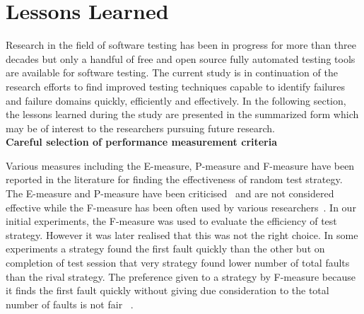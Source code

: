 \section{Lessons Learned}
Research in the field of software testing has been in progress for more than three decades but only a handful of free and open source fully automated testing tools are available for software testing. The current study is in continuation of the research efforts to find improved testing techniques capable to identify failures and failure domains quickly, efficiently and effectively. In the following section, the lessons learned during the study are presented in the summarized form which may be of interest to the researchers pursuing future research.\\

  
    
\textbf{Careful selection of performance measurement criteria}

Various measures including the E-measure, P-measure and F-measure have been reported in the literature for finding the effectiveness of random test strategy. The E-measure and P-measure have been criticised~\cite{chen2005adaptive} and are not considered effective while the F-measure has been often used by various researchers~\cite{chen2004statistical, chen1996expected}. In our initial experiments, the F-measure was used to evaluate the efficiency of test strategy. However it was later realised that this was not the right choice. In some experiments a strategy found the first fault quickly than the other but on completion of test session that very strategy found lower number of total faults than the rival strategy. The preference given to a strategy by F-measure because it finds the first fault quickly without giving due consideration to the total number of faults is not fair
~\cite{liu2012comparison}. \\

